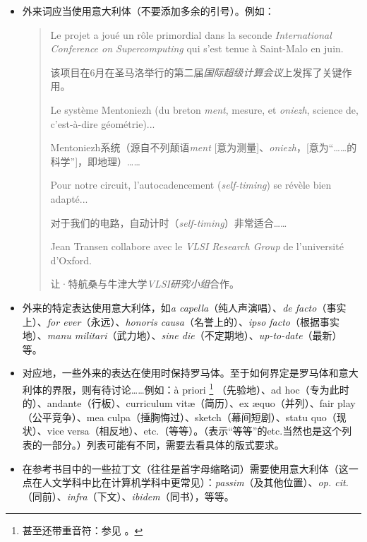 \begin{itemize}
    \item 外来词应当使用意大利体（不要添加多余的引号）。例如：
    \begin{quote}
        Le projet a joué un rôle primordial dans la seconde \emph{International Conference on Supercomputing} qui s'est tenue à Saint-Malo en juin.
        \begin{bil}
            该项目在6月在圣马洛举行的第二届\emph{国际超级计算会议}上发挥了关键作用。
        \end{bil}

        Le système Mentoniezh (du breton \emph{ment}, mesure, et \emph{oniezh}, science de, c'est-à-dire géométrie)...
        \begin{bil}
            Mentoniezh系统（源自不列颠语\emph{ment} [意为测量]、\emph{oniezh}，[意为``……的科学'']，即地理）……
        \end{bil}

        Pour notre circuit, l'autocadencement (\emph{self-timing}) se révèle bien adapté...
        \begin{bil}
            对于我们的电路，自动计时（\emph{self-timing}）非常适合……
        \end{bil}

        Jean Transen collabore avec le \emph{VLSI Research Group} de l'université d'Oxford.
        \begin{bil}
            让·特航桑与牛津大学\emph{VLSI研究小组}合作。
        \end{bil}
    \end{quote}
    \item 外来的特定表达使用意大利体，如\emph{a capella}（纯人声演唱）、\emph{de facto}（事实上）、\emph{for ever}（永远）、\emph{honoris causa}（名誉上的）、\emph{ipso facto}（根据事实地）、\emph{manu militari}（武力地）、\emph{sine die}（不定期地）、\emph{up-to-date}（最新）等。
    \item 对应地，一些外来的表达在使用时保持罗马体。至于如何界定是罗马体和意大利体的界限，则有待讨论……例如：à priori
        \footnote{甚至还带重音符：参见  。}
    （先验地）、ad hoc（专为此时的）、andante（行板）、curriculum vitæ（简历）、ex æquo（并列）、fair play（公平竞争）、mea culpa（捶胸悔过）、sketch（幕间短剧）、statu quo（现状）、vice versa（相反地）、etc.（等等）。（表示``等等''的etc.当然也是这个列表的一部分。）列表可能有不同，需要去看具体的版式要求。
    \item 在参考书目中的一些拉丁文（往往是首字母缩略词）需要使用意大利体（这一点在人文学科中比在计算机学科中更常见）：\emph{passim}（及其他位置）、\emph{op. cit.}（同前）、\emph{infra}（下文）、\emph{ibidem}（同书），等等。
\end{itemize}

